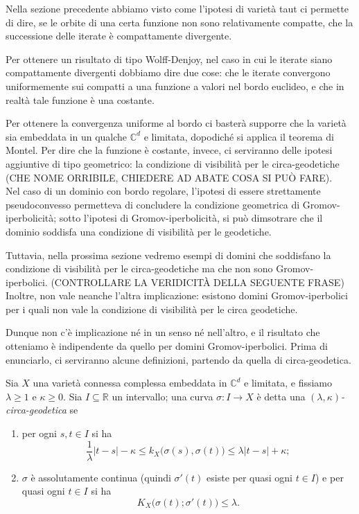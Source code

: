 Nella sezione precedente abbiamo visto come l'ipotesi di varietà taut ci permette di dire, se le orbite di una certa funzione non sono relativamente compatte, che la successione delle iterate è compattamente divergente.

Per ottenere un risultato di tipo Wolff-Denjoy, nel caso in cui le iterate siano compattamente divergenti dobbiamo dire due cose: che le iterate convergono uniformemente sui compatti a una funzione a valori nel bordo euclideo, e che in realtà tale funzione è una costante.

Per ottenere la convergenza uniforme al bordo ci basterà supporre che la varietà sia embeddata in un qualche $\mathbb{C}^d$ e limitata, dopodiché si applica il teorema di Montel. Per dire che la funzione è costante, invece, ci serviranno delle ipotesi aggiuntive di tipo geometrico: la condizione di visibilità per le circa-geodetiche (CHE NOME ORRIBILE, CHIEDERE AD ABATE COSA SI PUÒ FARE). \\

Nel caso di un dominio con bordo regolare, l'ipotesi di essere strettamente pseudoconvesso permetteva di concludere la condizione geometrica di Gromov-iperbolicità; sotto l'ipotesi di Gromov-iperbolicità, si può dimsotrare che il dominio soddisfa una condizione di visibilità per le geodetiche.

Tuttavia, nella prossima sezione vedremo esempi di domini che soddisfano la condizione di visibilità per le circa-geodetiche ma che non sono Gromov-iperbolici. (CONTROLLARE LA VERIDICITÀ DELLA SEGUENTE FRASE) Inoltre, non vale neanche l'altra implicazione: esistono domini Gromov-iperbolici per i quali non vale la condizione di visibilità per le circa geodetiche.

Dunque non c'è implicazione né in un senso né nell'altro, e il risultato che otteniamo è indipendente da quello per domini Gromov-iperbolici. Prima di enunciarlo, ci serviranno alcune definizioni, partendo da quella di circa-geodetica.

\begin{defn}
    Sia $X$ una varietà connessa complessa embeddata in $\mathbb{C}^d$ e limitata, e fissiamo $\lambda \ge 1$ e $\kappa \ge 0$. Sia $I\subseteq \mathbb{R}$ un intervallo; una curva $\sigma:I \longrightarrow X$ è detta una \textit{$(\lambda,\kappa)$-circa-geodetica} se
    \begin{enumerate}
        \item per ogni $s,t \in I$ si ha
        $$\frac{1}{\lambda}|t-s|-\kappa \le k_X\big(\sigma(s),\sigma(t)\big)\le\lambda|t-s|+\kappa;$$
        \item $\sigma$ è assolutamente continua (quindi $\sigma'(t)$ esiste per quasi ogni $t \in I$) e per quasi ogni $t \in I$ si ha
        $$K_X\big(\sigma(t);\sigma'(t)\big) \le \lambda.$$
    \end{enumerate}
\end{defn}

